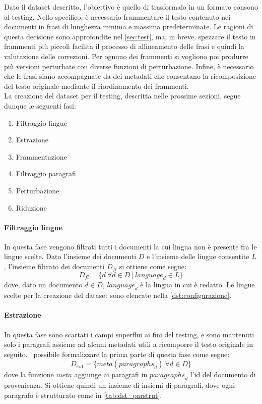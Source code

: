Dato il dataset descritto, l'obiettivo è quello di trasformalo in un formato consono al testing. Nello specifico, è necessario frammentare il testo contenuto nei documenti in frasi di lunghezza minima e massima predeterminate. Le ragioni di questa decisione sono approfondite nel \autoref{sec:test}, ma, in breve, spezzare il testo in frammenti più piccoli facilita il processo di allineamento delle frasi e quindi la valutazione delle correzioni. Per ognuno dei frammenti si vogliono poi produrre più versioni perturbate con diverse funzioni di perturbazione. Infine, è necessario che le frasi siano accompagnate da dei metadati che consentano la ricomposizione del testo originale mediante il riordinamento dei frammenti.\\
La creazione del dataset per il testing, descritta nelle prossime sezioni, segue dunque le seguenti fasi:
\begin{enumerate}
\item Filtraggio lingue
\item Estrazione
\item Frammentazione
\item Filtraggio paragrafi
\item Perturbazione
\item Riduzione
\end{enumerate}

\paragraph{Filtraggio lingue}
In questa fase vengono filtrati tutti i documenti la cui lingua non è presente fra le lingue scelte. Dato l'insieme dei documenti $D$ e l'insieme delle lingue consentite $L$, l'insieme filtrato dei documenti $D_{fl}$ si ottiene come segue:
\begin{equation}
D_{fl} = \{d\ \forall d \in D\ |\ \textit{language}_d \in L  \} 
\end{equation}
dove, dato un documento $d \in D$, $\textit{language}_d$ è la lingua in cui è redatto. Le lingue scelte per la creazione del dataset sono elencate nella \autoref{dst:configurazione}.

\paragraph{Estrazione}
In questa fase sono scartati i campi superflui ai fini del testing, e sono mantenuti solo i paragrafi assieme ad alcuni metadati utili a ricomporre il testo originale in seguito. \E\ possibile formalizzare la prima parte di questa fase come segue:
\begin{equation}
D_{es1} = \{ meta({paragraphs}_d)\ \forall d \in D  \}
\end{equation}
dove la funzione $meta$ aggiunge ai paragrafi in ${paragraphs}_d$ l'id del documento di provenienza. Si ottiene quindi un insieme di insiemi di paragrafi, dove ogni paragrafo è strutturato come in \autoref{tab:dst_parstrut}.


